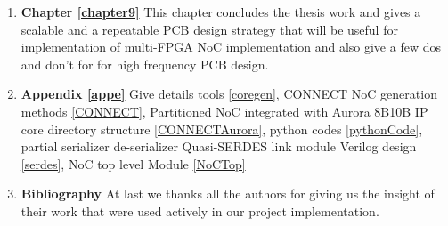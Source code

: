 \begin{enumerate}
	\item{\textbf{Chapter \ref{chapter9}} This chapter concludes the thesis work and gives a scalable and a repeatable PCB design strategy that will be useful for implementation of multi-FPGA NoC implementation and also give a few dos and don't for for high frequency PCB design.}	
	\item{\textbf{Appendix \ref{appe}} Give details tools \ref{coregen}, CONNECT NoC generation methods \ref{CONNECT}, Partitioned NoC integrated with Aurora 8B10B IP core directory structure \ref{CONNECTAurora}, python codes \ref{pythonCode}, partial serializer de-serializer Quasi-SERDES link module Verilog design \ref{serdes}, NoC top level Module \ref{NoCTop}}
	\item{\textbf{Bibliography} At last we thanks all the authors for giving us the insight of their work that were used actively in our project implementation.}
\end{enumerate}
